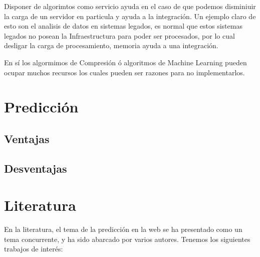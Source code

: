 Disponer de algorimtos como servicio ayuda en el caso de que podemos disminiuir la carga de un servidor en particula y ayuda a la integración. Un ejemplo claro de esto son el analisis de datos en sistemas legados, es normal que estos sistemas legados no posean la Infraestructura para poder ser procesados, por lo cual desligar la carga de procesamiento, memoria ayuda a una integración.

En sí los algormimos de Compresión ó algoritmos de Machine Learning pueden ocupar muchos recursos los cuales pueden ser razones para no implementarlos.






\section{Predicción }

  \subsection{Ventajas }


  \subsection{Desventajas }


\section{Literatura}
En la literatura, el tema de la predicción en la web se ha presentado como un tema concurrente, y ha sido abarcado por varios autores. Tenemos los siguientes trabajos de interés:

